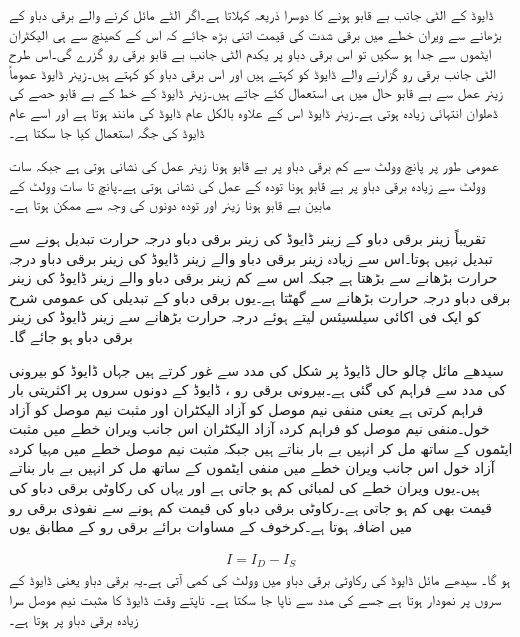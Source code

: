 ڈایوڈ کے الٹی جانب بے قابو ہونے کا دوسرا ذریعہ   کہلاتا ہے۔اگر الٹے مائل کرنے والے برقی دباو کے بڑھانے سے ویران خطے میں برقی شدت کی قیمت اتنی بڑھ جائے کہ اس کے کھینچ سے ہی الیکٹران ایٹموں سے جدا ہو سکیں تو اس برقی دباو پر یکدم الٹی جانب بے قابو برقی رو گزرے گی۔اس طرح الٹی جانب برقی رو گزارنے والے ڈایوڈ کو   کہتے ہیں اور اس برقی دباو   کو   کہتے ہیں۔زینر  ڈایوڈ عموماً زینر عمل سے بے قابو حال میں ہی استعمال کئے جاتے ہیں۔زینر  ڈایوڈ کے خط کے بے قابو حصے کی ڈھلوان  انتہائی زیادہ ہوتی ہے۔زینر  ڈایوڈ اس کے علاوہ بالکل عام  ڈایوڈ کی مانند ہوتا ہے اور اسے عام  ڈایوڈ کی جگہ استعمال کیا جا سکتا ہے۔

عمومی طور پر پانچ وولٹ سے کم برقی دباو پر بے قابو ہونا زینر عمل کی نشانی ہوتی ہے جبکہ سات وولٹ سے زیادہ برقی دباو پر بے قابو ہونا تودہ کے عمل کی نشانی ہوتی ہے۔پانچ تا سات وولٹ کے مابین بے قابو ہونا زینر اور تودہ دونوں کی وجہ سے ممکن ہوتا ہے۔

تقریباً  زینر برقی دباو کے زینر ڈایوڈ کی زینر  برقی دباو درجہ حرارت تبدیل ہونے سے تبدیل نہیں ہوتا۔اس سے زیادہ زینر برقی دباو والے زینر ڈایوڈ کی زینر برقی دباو درجہ حرارت بڑھانے سے بڑھتا ہے جبکہ اس سے کم  زینر برقی دباو والے زینر ڈایوڈ کی زینر برقی دباو درجہ حرارت بڑھانے سے گھٹتا ہے۔یوں  برقی دباو کے تبدیلی کی عمومی شرح کو  ایک فی اکائی سیلسیئس  لیتے ہوئے درجہ حرارت  بڑھانے سے  زینر ڈایوڈ کی زینر برقی دباو  ہو جائے گا۔  

	سیدھے مائل چالو حال ڈایوڈ پر شکل   کی مدد سے غور کرتے ہیں جہاں ڈایوڈ کو بیرونی   کی مدد سے  فراہم کی گئی ہے۔بیرونی برقی رو ، ڈایوڈ کے دونوں سروں پر اکثریتی بار فراہم کرتی ہے یعنی منفی نیم موصل کو آزاد الیکٹران اور مثبت نیم موصل کو آزاد خول۔منفی نیم موصل کو فراہم کردہ آزاد الیکٹران اس جانب ویران خطے میں مثبت ایٹموں کے ساتھ مل کر انہیں بے بار بناتے ہیں جبکہ مثبت نیم موصل خطے میں مہیا کردہ آزاد خول اس جانب ویران خطے میں منفی ایٹموں کے ساتھ مل کر انہیں بے بار بناتے ہیں۔یوں ویران خطے کی لمبائی کم ہو جاتی ہے اور یہاں کی رکاوٹی برقی دباو کی قیمت بھی کم ہو جاتی ہے۔رکاوٹی برقی دباو کی قیمت کم ہونے سے نفوذی برقی رو  میں اضافہ ہوتا ہے۔کرخوف کے مساوات برائے برقی رو کے مطابق یوں

\begin{align} \label{مساوات_ڈایوڈ_رو_برابر_نفوذ_منفی_لبریزی_رو}
I=I_D-I_S
\end{align}
ہو گا۔
	سیدھے مائل ڈایوڈ کی رکاوٹی برقی دباو میں  وولٹ کی کمی آتی ہے۔یہ برقی دباو یعنی  ڈایوڈ کے سروں پر نمودار ہوتا ہے جسے  کی مدد سے ناپا جا سکتا ہے۔ ناپتے وقت ڈایوڈ کا مثبت نیم موصل سرا زیادہ برقی دباو پر ہوتا ہے۔

